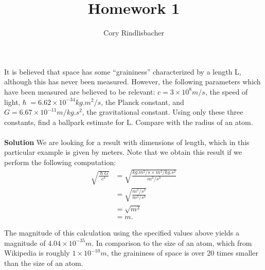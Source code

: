 \documentclass[12pt]{article}
\newenvironment{exercise}[2][Exercise]{\begin{trivlist}
\item[\hskip \labelsep {\bfseries #1}\hskip \labelsep {\bfseries #2.}]}{\end{trivlist}}
\begin{document}
 
 
 
\title{Homework 1}%
\author{Cory Rindlisbacher\\ %
} %
 
\maketitle
 
\begin{exercise}{1} %
It is believed that space has some “graininess” characterized by a length L, although this has never been measured. However, the following parameters which have been measured are believed to be relevant: $c = 3 \times 10^{8} \si{m/s}$, the speed of light,$\hslash = 6.62 \times 10^{−34} \si{kg.m^{2}/ s}$, the Planck constant, and $G = 6.67 \times 10^{−11} \si{m/ kg.s^{2}}$, the gravitational constant. Using only these three constants, ﬁnd a ballpark estimate for L. Compare with the radius of an atom.
\\
\\
\textbf{Solution}
We are looking for a result with dimensions of length, which in this particular example is given by meters. Note that we obtain this result if we perform the following computation:
\begin{align*}
\sqrt{\frac{\hslash G} {c^3}} &= \sqrt{{\frac{\si{kg.m^{2}/s} \times \si{m^3 / kg.s^2}}{\si{m^3/s^3}}}} \\
&= \sqrt{\frac{\si{m^5/s^3}}{\si{m^3/s^3}}} \\
&= \sqrt{\si{m^2}} \\
&= \si{m}.
\end{align*}

The magnitude of this calculation using the specified values above yields a magnitude of $4.04 \times 10^{-35} \si{m}$. In comparison to the size of an atom, which from Wikipedia is roughly $1 \times 10^{-10} \si{m}$, the graininess of space is over 20 times smaller than the size of an atom. \\

\end{exercise}
 
\end{document}
